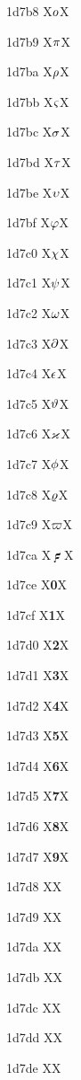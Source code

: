 \documentclass[11pt]{article}
\begin{document}
1d7b8 X{\ensuremath{\mathsfbfsl{o}}}X

1d7b9 X{\ensuremath{\mathsfbfsl{\pi}}}X

1d7ba X{\ensuremath{\mathsfbfsl{\rho}}}X

1d7bb X{\ensuremath{\mathsfbfsl{\varsigma}}}X

1d7bc X{\ensuremath{\mathsfbfsl{\sigma}}}X

1d7bd X{\ensuremath{\mathsfbfsl{\tau}}}X

1d7be X{\ensuremath{\mathsfbfsl{\upsilon}}}X

1d7bf X{\ensuremath{\mathsfbfsl{\varphi}}}X

1d7c0 X{\ensuremath{\mathsfbfsl{\chi}}}X

1d7c1 X{\ensuremath{\mathsfbfsl{\psi}}}X

1d7c2 X{\ensuremath{\mathsfbfsl{\omega}}}X

1d7c3 X{\ensuremath{\mathsfbfsl{\partial}}}X

1d7c4 X{\ensuremath{\mathsfbfsl{\epsilon}}}X

1d7c5 X{\ensuremath{\mathsfbfsl{\vartheta}}}X

1d7c6 X{\ensuremath{\mathsfbfsl{\varkappa}}}X

1d7c7 X{\ensuremath{\mathsfbfsl{\phi}}}X

1d7c8 X{\ensuremath{\mathsfbfsl{\varrho}}}X

1d7c9 X{\ensuremath{\mathsfbfsl{\varpi}}}X

1d7ca X{\ensuremath{\mathbf{\digamma}}}X

1d7ce X{\textbf{0}}X

1d7cf X{\textbf{1}}X

1d7d0 X{\textbf{2}}X

1d7d1 X{\textbf{3}}X

1d7d2 X{\textbf{4}}X

1d7d3 X{\textbf{5}}X

1d7d4 X{\textbf{6}}X

1d7d5 X{\textbf{7}}X

1d7d6 X{\textbf{8}}X

1d7d7 X{\textbf{9}}X

1d7d8 X{}X

1d7d9 X{}X

1d7da X{}X

1d7db X{}X

1d7dc X{}X

1d7dd X{}X

1d7de X{}X
\end{document}
